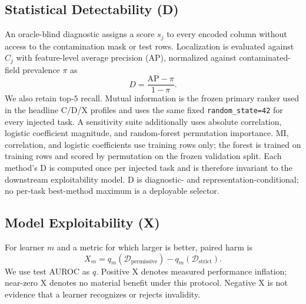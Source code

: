 \documentclass[letterpaper]{article}
\begin{document}
\subsection{Statistical Detectability (D)}
An oracle-blind diagnostic assigns a score $s_j$ to every encoded column
without access to the contamination mask or test rows.
Localization is evaluated against $C_j$ with feature-level average precision
(AP), normalized against contaminated-field prevalence $\pi$ as
\begin{equation}
D = \frac{\mathrm{AP}-\pi}{1-\pi}.
\end{equation}
We also retain top-$5$ recall.  Mutual information is the frozen primary
ranker used in the headline C/D/X profiles and uses the same fixed
\texttt{random\_state=42} for every injected task.  A sensitivity suite additionally
uses absolute correlation, logistic coefficient magnitude, and random-forest
permutation importance.  MI, correlation, and logistic coefficients use
training rows only; the forest is trained on training rows and scored by
permutation on the frozen validation split.  Each method's D is computed once
per injected task and is therefore invariant to the downstream exploitability
model.  D is diagnostic- and representation-conditional; no per-task
best-method maximum is a deployable selector.

\subsection{Model Exploitability (X)}
For learner $m$ and a metric for which larger is better, paired harm is
\begin{equation}
X_m = q_m(\mathcal{D}_{\mathrm{permissive}})
      -q_m(\mathcal{D}_{\mathrm{strict}}).
\end{equation}
We use test AUROC as $q$.  Positive X denotes measured performance inflation;
near-zero X denotes no material benefit under this protocol.  Negative X is not
evidence that a learner recognizes or rejects invalidity.
\end{document}
